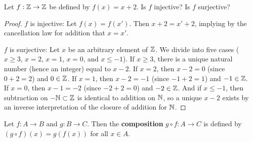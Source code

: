 \documentclass[../main.tex]{subfiles}
\begin{document}
\begin{exercise}\label{exr:1.24}
    Let $f:\mathbb{Z}\to\mathbb{Z}$ be defined by $f(x)=x+2$. Is $f$ injective? Is $f$ surjective?
    \begin{proof}
        $f$ is injective: Let $f(x)=f(x')$. Then $x+2=x'+2$, implying by the cancellation law for addition that $x=x'$.\par
        $f$ is surjective: Let $x$ be an arbitrary element of $\mathbb{Z}$. We divide into five cases ($x\geq 3$, $x=2$, $x=1$, $x=0$, and $x\leq -1$). If $x\geq 3$, there is a unique natural number (hence an integer) equal to $x-2$. If $x=2$, then $x-2=0$ (since $0+2=2$) and $0\in\mathbb{Z}$. If $x=1$, then $x-2=-1$ (since $-1+2=1$) and $-1\in\mathbb{Z}$. If $x=0$, then $x-1=-2$ (since $-2+2=0$) and $-2\in\mathbb{Z}$. And if $x\leq -1$, then subtraction on $-\mathbb{N}\subset\mathbb{Z}$ is identical to addition on $\mathbb{N}$, so a unique $x-2$ exists by an inverse interpretation of the closure of addition for $\mathbb{N}$.
    \end{proof}
\end{exercise}

\begin{definition}\label{dfn:1.25}
    Let $f:A\to B$ and $g:B\to C$. Then the \textbf{composition} $g\circ f:A\to C$ is defined by $(g\circ f)(x)=g(f(x))$ for all $x\in A$.
\end{definition}
\end{document}
